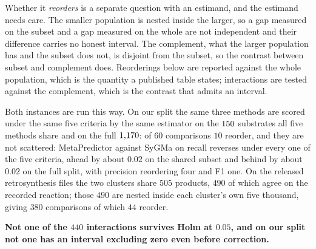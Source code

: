 Whether it \emph{reorders} is a separate question with an estimand, and the estimand needs care. The
smaller population is nested inside the larger, so a gap measured on the subset and a gap measured
on the whole are not independent and their difference carries no honest interval. The complement, what the larger population has and the subset does not, is disjoint from the subset, so the
contrast between subset and complement does. Reorderings below are reported against the whole population, which is the quantity a published table states; interactions are tested against the complement, which is the contrast that admits an interval.

Both instances are run this way. On our split the same three methods are scored under the same five
criteria by the same estimator on the $150$ substrates all five methods share and on the full
$1{,}170$: of $60$ comparisons $10$ reorder, and they are not scattered: MetaPredictor against
SyGMa on recall reverses under every one of the five criteria, ahead by about $0.02$ on the shared
subset and behind by about $0.02$ on the full split, with precision reordering four and F1 one. On
the released retrosynthesis files the two clusters share $505$ products, $490$ of which agree on the
recorded reaction; those $490$ are nested inside each cluster's own five thousand, giving $380$
comparisons of which $44$ reorder.

\textbf{Not one of the $440$ interactions survives Holm at $0.05$, and on our split not one has an
interval excluding zero even before correction.}

